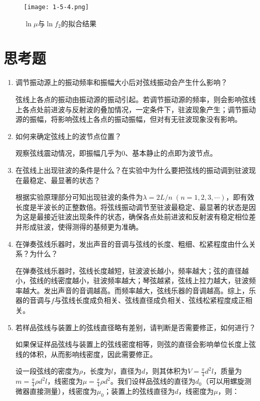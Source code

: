 \documentclass[12pt]{article}
\begin{document}
\begin{figure}[htbp]
    \centering
    \texttt{[image: 1-5-4.png]}
    \caption{$\ln \mu$与$\ln f_2$的拟合结果}
    \label{fig:5}
\end{figure}

\section{思考题}
\begin{enumerate}   
    \item {\kaishu 调节振动源上的振动频率和振幅大小后对弦线振动会产生什么影响？}
    
    弦线上各点的振动由振动源的振动引起。若调节振动源的频率，则会影响弦线上各点处前进波与反射波的叠加情况，一定条件下，驻波现象产生；调节振动源的振幅，将影响弦线上各点的振动振幅，但对有无驻波现象没有影响。
    
    \item {\kaishu 如何来确定弦线上的波节点位置？}
    
    观察弦线震动情况，即振幅几乎为0、基本静止的点即为波节点。

    \item {\kaishu 在弦线上出现驻波的条件是什么？在实验中为什么要把弦线的振动调到驻波现在最稳定、最显著的状态？}
    
    根据实验原理部分可知出现驻波的条件为$ \lambda = 2L/n\;(n=1,2,3,\cdots) $，即有效长度是半波长的正整数倍。将弦线振动调节至驻波最稳定、最显著的状态是因为这是最接近驻波出现条件的状态，确保各点处前进波和反射波有稳定相位差并形成驻波，使得测得的基频更为准确。

    \item {\kaishu 在弹奏弦线乐器时，发出声音的音调与弦线的长度、粗细、松紧程度由什么关系？为什么？}
    
    在弹奏弦线乐器时，弦线长度越短，驻波波长越小，频率越大；弦的直径越小，弦线的线密度越小，驻波频率越大；琴弦越紧，弦线上拉力越大，驻波频率越大。发出声音的音调越高。而频率越大，弦线乐器的音调越高。综上，乐器的音调与$ f $与弦线长度成负相关、弦线直径成负相关、弦线松紧程度成正相关。
    
    \item {\kaishu 若样品弦线与装置上的弦线直径略有差别，请判断是否需要修正，如何进行？}
    
    如果保证样品弦线与装置上的弦线密度相等，则弦的直径会影响单位长度上弦线的体积，从而影响线密度，因此需要修正。
    
    设一段弦线的密度为$\rho$，长度为$l$，直径为$d$，则其体积为$V=\frac{\pi}{4}d^2l$，质量为$m=\frac{\pi}{4}\rho d^2l$，线密度为$\mu=\frac{\pi}{4}\rho d^2$。我们设样品弦线的直径为$d_0$（可以用螺旋测微器直接测量），线密度为$\mu_0$；装置上的弦线直径为$d$，线密度为$\mu$，则：


\end{enumerate}
\end{document}
